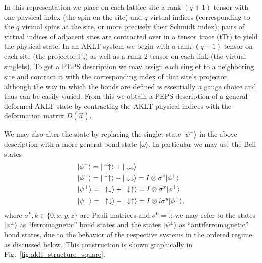 \documentclass[aps,prb,letterpaper,superscriptaddress,twocolumn,showpacs,floatfix,10pt]{revtex4-1}
\begin{document}
In this representation we place on each lattice site
a rank-$(q+1)$ tensor with one physical index (the spin on the site) and
$q$ virtual indices (corresponding to the $q$ virtual spins at the site,
or more precisely their Schmidt index);
pairs of virtual indices of adjacent sites are contracted over in a tensor trace
(tTr) to yield the physical state. In an AKLT system we begin with a
rank-$(q+1)$
tensor on each site (the projector $\mathbb{P}_q$) as well as a rank-2 tensor
on each link (the virtual singlets). To get a PEPS description we may 
assign each singlet to a neighboring site and contract it with the
corresponding index of that site's projector, although the way in
which the bonds are defined is essentially a gauge choice and
thus can be easily varied. From this we obtain a PEPS description of a general
deformed-AKLT state by contracting the AKLT physical indices with the
deformation matrix $D(\vec{a})$.

We may also alter the state by replacing the singlet state $|\psi^-\rangle$
in the above description with a more general bond state $|\omega\rangle$.
In particular we may use the Bell states
\begin{align}
& | \phi^+ \rangle= |\uparrow \uparrow \rangle+| \downarrow \downarrow \rangle \notag \\
& | \phi^- \rangle = | \uparrow \uparrow \rangle-|\downarrow \downarrow \rangle =  I \otimes \sigma^z | \phi^+ \rangle  \notag \\
& | \psi^+ \rangle = | \uparrow \downarrow \rangle+| \downarrow \uparrow \rangle =  I \otimes \sigma^x | \phi^+ \rangle  \notag \\
& | \psi^- \rangle = | \uparrow \downarrow \rangle-|\downarrow \uparrow\rangle =  I \otimes i \sigma^y | \phi^+ \rangle,
\end{align} 
where $ \sigma^k,   k\in \{0,x,y,z\}$ are Pauli matrices and $ \sigma^0=  \mathbb{I}$; we may refer to the states $|\phi^\pm\rangle$ as ``ferromagnetic''
bond states and the states $|\psi^\pm\rangle$ as ``antiferromagnetic'' bond
states, due to the behavior of the respective systems in the ordered regime
as discussed below.
This construction is shown graphically in Fig.~\ref{fig:aklt_structure_square}.
\end{document}
